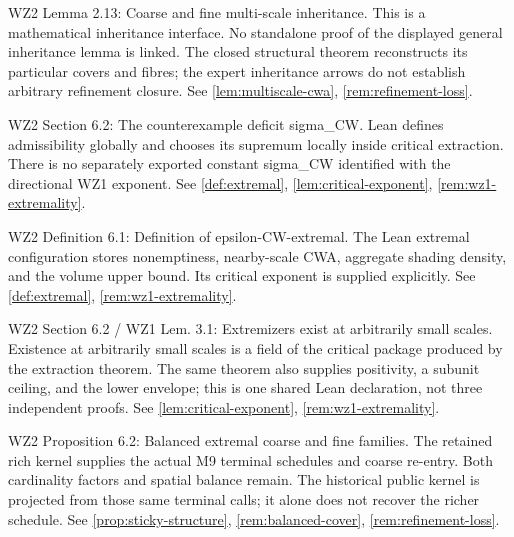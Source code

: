 \begin{remark}
\label{rem:atlas-W2L2_13}
WZ2 Lemma 2.13: Coarse and fine multi-scale inheritance.
This is a mathematical inheritance interface. No standalone proof of the displayed general inheritance lemma is linked. The closed structural theorem reconstructs its particular covers and fibres; the expert inheritance arrows do not establish arbitrary refinement closure.
See \ref{lem:multiscale-cwa}, \ref{rem:refinement-loss}.
\end{remark}

\begin{remark}
\label{rem:atlas-W2Sigma}
WZ2 Section 6.2: The counterexample deficit sigma\_CW.
Lean defines admissibility globally and chooses its supremum locally inside critical extraction. There is no separately exported constant sigma\_CW identified with the directional WZ1 exponent.
See \ref{def:extremal}, \ref{lem:critical-exponent}, \ref{rem:wz1-extremality}.
\end{remark}

\begin{remark}
\label{rem:atlas-W2D6_1}
WZ2 Definition 6.1: Definition of epsilon-CW-extremal.
The Lean extremal configuration stores nonemptiness, nearby-scale CWA, aggregate shading density, and the volume upper bound. Its critical exponent is supplied explicitly.
See \ref{def:extremal}, \ref{rem:wz1-extremality}.
\end{remark}

\begin{remark}
\label{rem:atlas-W2Exists}
WZ2 Section 6.2 / WZ1 Lem. 3.1: Extremizers exist at arbitrarily small scales.
Existence at arbitrarily small scales is a field of the critical package produced by the extraction theorem. The same theorem also supplies positivity, a subunit ceiling, and the lower envelope; this is one shared Lean declaration, not three independent proofs.
See \ref{lem:critical-exponent}, \ref{rem:wz1-extremality}.
\end{remark}

\begin{remark}
\label{rem:atlas-W2P6_2}
WZ2 Proposition 6.2: Balanced extremal coarse and fine families.
The retained rich kernel supplies the actual M9 terminal schedules and coarse re-entry. Both cardinality factors and spatial balance remain. The historical public kernel is projected from those same terminal calls; it alone does not recover the richer schedule.
See \ref{prop:sticky-structure}, \ref{rem:balanced-cover}, \ref{rem:refinement-loss}.
\end{remark}

